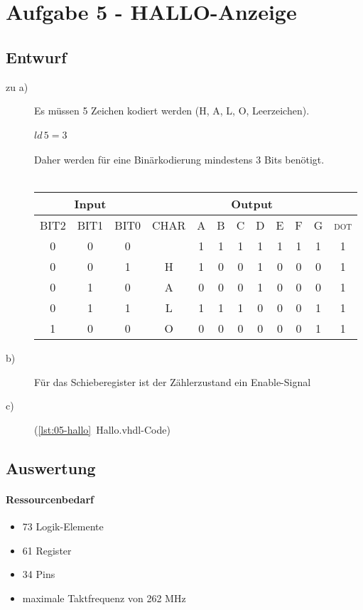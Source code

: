 \section{Aufgabe 5 - HALLO-Anzeige}
\subsection{Entwurf}
	\begin{description}
	\item[zu a)] Es müssen 5 Zeichen kodiert werden (H, A, L, O, Leerzeichen).\\
			\\\(ld\, 5 = 3\)\\\\
			Daher werden für eine Binärkodierung mindestens 3 Bits benötigt.\\\\
			\begin{tabular}{|c|c|c||c|c|c|c|c|c|c|c|c|}
		\hline
		\multicolumn{3}{|c||}{Input} & \multicolumn{9}{|c|}{Output} \\
		\hline
		\textsc{BIT2} & \textsc{BIT1} & \textsc{BIT0} & 
		\textsc{CHAR} & \textsc{A} & \textsc{B} & \textsc{C} & \textsc{D} & \textsc{E} & \textsc{F} & \textsc{G} & \textsc{dot} \\ 
		\hline
		\hline
		0 & 0 & 0 &   & 1 & 1 & 1 & 1 & 1 & 1 & 1 & 1 \\ 
		0 & 0 & 1 & H & 1 & 0 & 0 & 1 & 0 & 0 & 0 & 1 \\
		0 & 1 & 0 & A & 0 & 0 & 0 & 1 & 0 & 0 & 0 & 1 \\
		0 & 1 & 1 & L & 1 & 1 & 1 & 0 & 0 & 0 & 1 & 1 \\
		1 & 0 & 0 & O & 0 & 0 & 0 & 0 & 0 & 0 & 1 & 1 \\
		\hline
	\end{tabular}
	\item[b)] Für das Schieberegister ist der Zählerzustand ein Enable-Signal
	\item[c)]  (\ref{lst:05-hallo}~Hallo.vhdl-Code) 
	\end{description}

	

\subsection{Auswertung}
	\paragraph{Ressourcenbedarf}
	\begin{itemize} 
	\item 73 Logik-Elemente
	\item 61 Register
	\item 34 Pins 
	\item maximale Taktfrequenz von 262 MHz
	\end{itemize}
